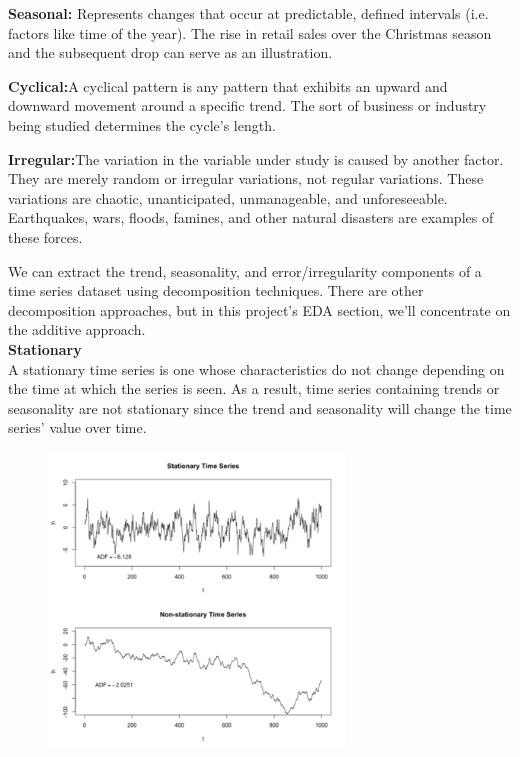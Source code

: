 \textbf{Seasonal:} Represents changes that occur at predictable, defined intervals (i.e. factors like time of the year). The rise in retail sales over the Christmas season and the subsequent drop can serve as an illustration.


\textbf{Cyclical:}A cyclical pattern is any pattern that exhibits an upward and downward movement around a specific trend. The sort of business or industry being studied determines the cycle's length.


\textbf{Irregular:}The variation in the variable under study is caused by another factor. They are merely random or irregular variations, not regular variations. These variations are chaotic, unanticipated, unmanageable, and unforeseeable. Earthquakes, wars, floods, famines, and other natural disasters are examples of these forces.


\vspace{10mm}

We can extract the trend, seasonality, and error/irregularity components of a time series dataset using decomposition techniques. There are other decomposition approaches, but in this project's EDA section, we'll concentrate on the additive approach. \\

\vspace{5mm}
\textbf{Stationary} \\
A stationary time series is one whose characteristics do not change depending on the time at which the series is seen. As a result, time series containing trends or seasonality are not stationary since the trend and seasonality will change the time series' value over time.

\begin{figure}[H]
    \centering
    \includegraphics[width=0.7\textwidth]{Images/stati.png}
    \caption{}
    \label{fig1}
\end{figure}

